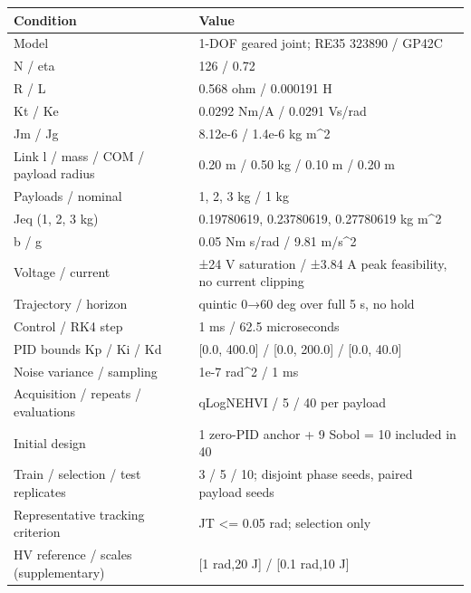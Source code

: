\begin{tabular}{ll}
\toprule
Condition & Value \\
\midrule
Model & 1-DOF geared joint; RE35 323890 / GP42C \\
N / eta & 126 / 0.72 \\
R / L & 0.568 ohm / 0.000191 H \\
Kt / Ke & 0.0292 Nm/A / 0.0291 Vs/rad \\
Jm / Jg & 8.12e-6 / 1.4e-6 kg m\textasciicircum 2 \\
Link l / mass / COM / payload radius & 0.20 m / 0.50 kg / 0.10 m / 0.20 m \\
Payloads / nominal & 1, 2, 3 kg / 1 kg \\
Jeq (1, 2, 3 kg) & 0.19780619, 0.23780619, 0.27780619 kg m\textasciicircum 2 \\
b / g & 0.05 Nm s/rad / 9.81 m/s\textasciicircum 2 \\
Voltage / current & ±24 V saturation / ±3.84 A peak feasibility, no current clipping \\
Trajectory / horizon & quintic 0→60 deg over full 5 s, no hold \\
Control / RK4 step & 1 ms / 62.5 microseconds \\
PID bounds Kp / Ki / Kd & [0.0, 400.0] / [0.0, 200.0] / [0.0, 40.0] \\
Noise variance / sampling & 1e-7 rad\textasciicircum 2 / 1 ms \\
Acquisition / repeats / evaluations & qLogNEHVI / 5 / 40 per payload \\
Initial design & 1 zero-PID anchor + 9 Sobol = 10 included in 40 \\
Train / selection / test replicates & 3 / 5 / 10; disjoint phase seeds, paired payload seeds \\
Representative tracking criterion & JT <= 0.05 rad; selection only \\
HV reference / scales (supplementary) & [1 rad,20 J] / [0.1 rad,10 J] \\
\bottomrule
\end{tabular}

